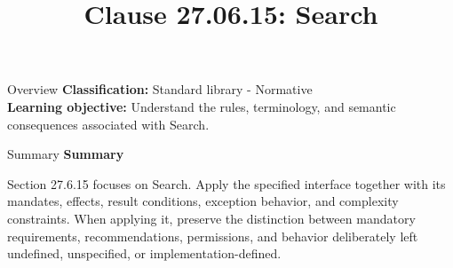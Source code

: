 \documentclass[10pt,letterpaper]{article}
\title{Clause 27.06.15: Search}
\author{}
\date{}
\begin{document}
\maketitle
\begin{CornellOverviewBox}{Overview}
\textbf{Classification:} Standard library - Normative\\[2pt]
\textbf{Learning objective:} Understand the rules, terminology, and semantic consequences associated with Search.
\end{CornellOverviewBox}\begin{CornellSummaryBox}{Summary}
{\sffamily\bfseries\color{Accent} Summary}\par\vspace{3pt}Section 27.6.15 focuses on Search. Apply the specified interface together with its mandates, effects, result conditions, exception behavior, and complexity constraints. When applying it, preserve the distinction between mandatory requirements, recommendations, permissions, and behavior deliberately left undefined, unspecified, or implementation-defined.
\end{CornellSummaryBox}
\end{document}
